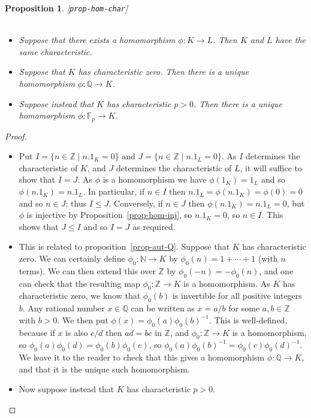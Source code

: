 \documentclass{amsart}
\newcommand{\lbl}[1]{\label{#1}\textup{[\texttt{#1}]}\ \\}
\newcommand{\lbl}{\label}
\newcommand{\N}         {{\mathbb{N}}}
\newcommand{\Z}         {{\mathbb{Z}}}
\newcommand{\Q}         {{\mathbb{Q}}}
\newcommand{\F}         {{\mathbb{F}}}
\newcommand{\st}        {\;|\;}
\renewcommand{\:}{\colon}
\newtheorem{proposition}[theorem]{Proposition}
\theoremstyle{definition}
\begin{document}
\begin{proposition}\lbl{prop-hom-char}\ \\
 \begin{itemize}
  \item[(a)] Suppose that there exists a homomorphism $\phi\:K\to L$.
   Then $K$ and $L$ have the same characteristic.
  \item[(b)] Suppose that $K$ has characteristic zero.  Then there is
   a unique homomorphism $\phi\:\Q\to K$.
  \item[(c)] Suppose instead that $K$ has characteristic $p>0$.  Then
   there is a unique homomorphism $\phi\:\F_p\to K$.
 \end{itemize}
\end{proposition}
\begin{proof}\ \\
 \begin{itemize}
  \item[(a)] Put $I=\{n\in\Z\st n.1_K=0\}$ and
   $J=\{n\in\Z\st n.1_L=0\}$.  As $I$ determines the characteristic of
   $K$, and $J$ determines the characteristic of $L$, it will suffice
   to show that $I=J$.  As $\phi$ is a homomorphism we have
   $\phi(1_K)=1_L$ and so $\phi(n.1_K)=n.1_L$.  In particular, if
   $n\in I$ then $n.1_L=\phi(n.1_K)=\phi(0)=0$ and so $n\in J$; thus
   $I\leq J$.  Conversely, if $n\in J$ then $\phi(n.1_K)=n.1_L=0$, but
   $\phi$ is injective by Proposition~\ref{prop-hom-inj}, so
   $n.1_K=0$, so $n\in I$.  This shows that $J\leq I$ and so $I=J$ as
   required.
  \item[(b)] This is related to proposition~\ref{prop-aut-Q}.  Suppose
   that $K$ has characteristic zero.  We can certainly define
   $\phi_0\:\N\to K$ by $\phi_0(n)=1+\dotsb+1$ (with $n$ terms).  We can
   then extend this over $\Z$ by $\phi_0(-n)=-\phi_0(n)$, and one can
   check that the resulting map $\phi_0\:\Z\to K$ is a homomorphism.  As
   $K$ has characteristic zero, we know that $\phi_0(b)$ is invertible
   for all positive integers $b$.  Any rational number $x\in\Q$ can be
   written as $x=a/b$ for some $a,b\in\Z$ with $b>0$.  We then put
   $\phi(x)=\phi_0(a)\phi_0(b)^{-1}$.  This is well-defined, because if
   $x$ is also $c/d$ then $ad=bc$ in $\Z$, and $\phi_0\:\Z\to K$ is a
   homomorphism, so $\phi_0(a)\phi_0(d)=\phi_0(b)\phi_0(c)$, so
   $\phi_0(a)\phi_0(b)^{-1}=\phi_0(c)\phi_0(d)^{-1}$.  We leave it to the
   reader to check that this gives a homomorphism $\phi\:\Q\to K$, and
   that it is the unique such homomorphism.
  \item[(c)] Now suppose instead that $K$ has characteristic $p>0$.

\end{itemize}
\end{proof}
\end{document}
